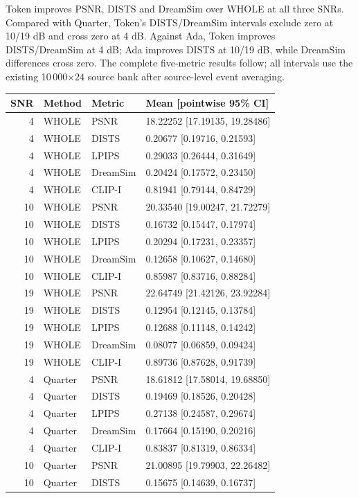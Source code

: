 \documentclass[10pt,letterpaper]{article}
\begin{document}
Token improves PSNR, DISTS and DreamSim over WHOLE at all three SNRs. Compared with Quarter, Token's DISTS/DreamSim intervals exclude zero at 10/19 dB and cross zero at 4 dB. Against Ada, Token improves DISTS/DreamSim at 4 dB; Ada improves DISTS at 10/19 dB, while DreamSim differences cross zero. The complete five-metric results follow; all intervals use the existing 10\,000$\times24$ source bank after source-level event averaging.

\begin{longtable}{@{}rlll@{}}\toprule
SNR & Method & Metric & Mean [pointwise 95\% CI]\\\midrule\endhead
4 & WHOLE & PSNR & 18.22252 [17.19135, 19.28486]\\
4 & WHOLE & DISTS & 0.20677 [0.19716, 0.21593]\\
4 & WHOLE & LPIPS & 0.29033 [0.26444, 0.31649]\\
4 & WHOLE & DreamSim & 0.20424 [0.17572, 0.23450]\\
4 & WHOLE & CLIP-I & 0.81941 [0.79144, 0.84729]\\
10 & WHOLE & PSNR & 20.33540 [19.00247, 21.72279]\\
10 & WHOLE & DISTS & 0.16732 [0.15447, 0.17974]\\
10 & WHOLE & LPIPS & 0.20294 [0.17231, 0.23357]\\
10 & WHOLE & DreamSim & 0.12658 [0.10627, 0.14680]\\
10 & WHOLE & CLIP-I & 0.85987 [0.83716, 0.88284]\\
19 & WHOLE & PSNR & 22.64749 [21.42126, 23.92284]\\
19 & WHOLE & DISTS & 0.12954 [0.12145, 0.13784]\\
19 & WHOLE & LPIPS & 0.12688 [0.11148, 0.14242]\\
19 & WHOLE & DreamSim & 0.08077 [0.06859, 0.09424]\\
19 & WHOLE & CLIP-I & 0.89736 [0.87628, 0.91739]\\
4 & Quarter & PSNR & 18.61812 [17.58014, 19.68850]\\
4 & Quarter & DISTS & 0.19469 [0.18526, 0.20428]\\
4 & Quarter & LPIPS & 0.27138 [0.24587, 0.29674]\\
4 & Quarter & DreamSim & 0.17664 [0.15190, 0.20216]\\
4 & Quarter & CLIP-I & 0.83837 [0.81319, 0.86334]\\
10 & Quarter & PSNR & 21.00895 [19.79903, 22.26482]\\
10 & Quarter & DISTS & 0.15675 [0.14639, 0.16737]\\

\end{longtable}
\end{document}
